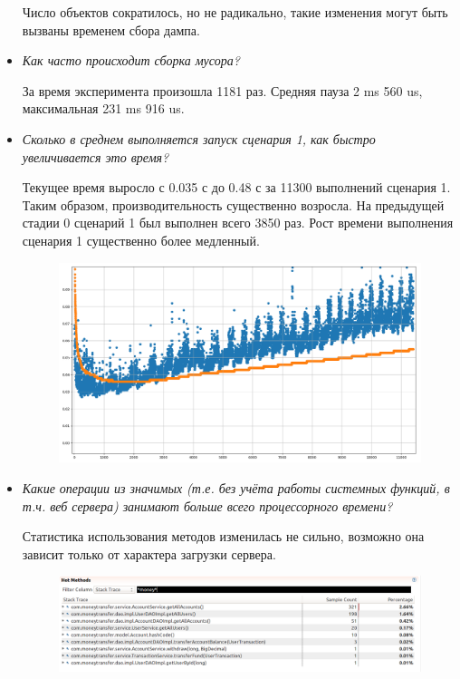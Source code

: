 \documentclass{article}
\begin{document}
\begin{itemize}
		Число объектов сократилось, но не радикально, такие изменения могут быть вызваны временем сбора дампа.
				
		\item \textit{Как часто происходит сборка мусора?}
		
		За время эксперимента произошла 1181 раз. Средняя пауза 2 ms 560 us, максимальная 231 ms 916 us. 
		
		\item \textit{Сколько в среднем выполняется запуск сценария 1, как быстро увеличивается это время?}
		
		Текущее время выросло с 0.035 с до  0.48 с за 11300 выполнений сценария 1. 
		Таким образом, производительность существенно возросла. На предыдущей стадии 0 сценарий 1 был выполнен всего 3850 раз. 
		Рост времени выполнения сценария 1 существенно более медленный.
		
		\begin{figure}[h!] %
			\centering
			\includegraphics[width=0.95\linewidth]{img/stage_1/pyplot.png}
			\label{fig:pyplot1}
		\end{figure}
		
		\newpage
		\item \textit{Какие операции из значимых (т.е. без учёта работы системных функций, в т.ч. веб сервера) занимают больше всего процессорного времени?}
		
		Статистика использования методов изменилась не сильно, возможно она зависит только от характера загрузки сервера.
		
		\begin{figure}[h!] %
			\centering
			\includegraphics[width=0.95\linewidth]{img/stage_1/hotmethods.png}
			\label{fig:hotmethods1}
		\end{figure}
		

\end{itemize}
\end{document}
